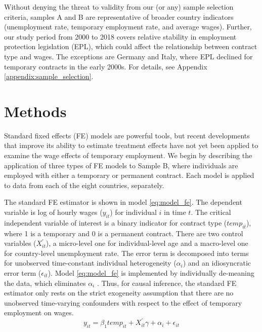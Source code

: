 \documentclass[12pt]{article}
\begin{document}
Without denying the threat to validity from our (or any) sample selection criteria, samples A and B are representative of broader country indicators (unemployment rate, temporary employment rate, and average wages).  Further, our study period from 2000 to 2018 covers relative stability in employment protection legislation (EPL), which could affect the relationship between contract type and wages. The exceptions are Germany and Italy, where EPL declined for temporary contracts in the early 2000s. For details, see Appendix \ref{appendix:sample_selection}.

\section{Methods}

Standard fixed effects (FE) models are powerful tools, but recent developments that improve its ability to estimate treatment effects have not yet been applied to examine the wage effects of temporary employment.  We begin by describing the application of three types of FE models to Sample B, where individuals are employed with either a temporary or permanent contract.  Each model is applied to data from each of the eight countries, separately. 

The standard FE estimator is shown in model \ref{eq:model_fe}.  The dependent variable is log of hourly wages ($y_{it}$) for individual $i$ in time $t$. The critical independent variable of interest is a binary indicator for contract type ($temp_{it}$), where 1 is a temporary and 0 is a permanent contract. There are two control variables ($X^\prime_{it}$), a micro-level one for individual-level age and a macro-level one for country-level unemployment rate. The error term is decomposed into terms for unobserved time-constant individual heterogeneity ($\alpha_i$) and an idiosyncratic error term ($\epsilon_{it}$).  Model \ref{eq:model_fe} is implemented by individually de-meaning the data, which eliminates $\alpha_i$ \citep{halaby_panel_2004}.  Thus, for causal inference, the standard FE estimator only rests on the strict exogeneity assumption that there are no unobserved time-varying confounders with respect to the effect of temporary employment on wages.
\begin{equation}
    y_{it} = \beta_1 temp_{it} + X^\prime_{it} \gamma + \alpha_i + \epsilon_{it}
    \label{eq:model_fe}
\end{equation}
\end{document}
